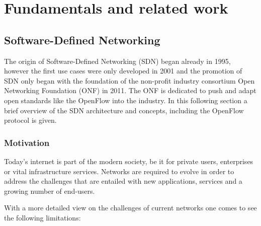 \chapter{Fundamentals and related work}

\section{Software-Defined Networking}

The origin of Software-Defined Networking (SDN) began already in 1995, however the first use cases were only developed in 2001 and the promotion of SDN only began with the foundation of the non-profit industry consortium Open Networking Foundation (ONF) in 2011. %
The ONF is dedicated to push and adapt open standards like the OpenFlow into the industry.
In this following section a brief overview of the SDN architecture and concepts, including the OpenFlow protocol is given.

\subsection{Motivation}

Today's internet is part of the modern society, be it for private users, enterprises or vital infrastructure services. Networks are required to evolve in order to address the challenges that are entailed with new applications, services and a growing number of end-users.

With a more detailed view on the challenges of current networks one comes to see the following limitations:

